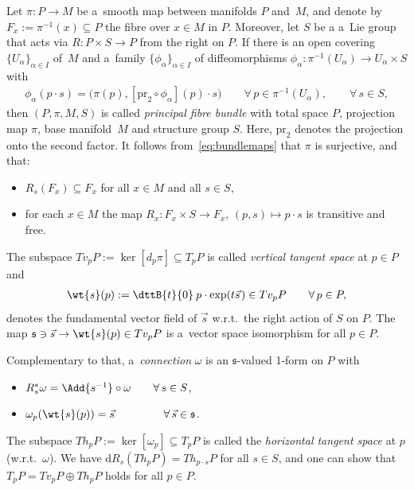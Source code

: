 \documentclass[pdftex]{sigma}
\numberwithin{equation}{section}
\begin{document}
Let $\pi\colon P\rightarrow M$ be a~smooth map between manifolds $P$ and~$M$, and denote by
$F_x:=\pi^{-1}(x)\subseteq P$ the f\/ibre over $x\in M$ in $P$.
Moreover, let $S$ be a a~Lie group that acts via $R\colon P\times S\rightarrow P$ from the right on $P$.
If there is an open covering $\{U_\alpha\}_{\alpha\in I}$ of~$M$ and a~family $\{\phi_\alpha\}_{\alpha\in I}$ of
dif\/feomorphisms $\phi_\alpha\colon \pi^{-1}(U_\alpha)\rightarrow U_\alpha\times S$ with
\begin{gather}
\label{eq:bundlemaps}
\phi_\alpha(p\cdot s)=\big(\pi(p),[\mathrm{pr}_2\circ\phi_\alpha](p)\cdot s\big)
\qquad\forall\, p\in \pi^{-1}(U_\alpha),\qquad\forall\, s\in S,
\end{gather}
then $(P,\pi,M,S)$ is called \emph{principal fibre bundle} with total space $P$,
projection map $\pi$, base manifold~$M$ and structure group $S$.
Here, $\mathrm{pr}_2$
denotes the projection onto the second factor.
It follows from~\eqref{eq:bundlemaps} that $\pi$ is surjective, and that:
\begin{itemize}\itemsep=0pt
\item
$R_s(F_x)\subseteq F_x$ for all $x\in M$ and all $s\in S$,
\item
for each $x\in M$ the map $R_x\colon F_x \times S\rightarrow F_x$, $(p,s)\mapsto p\cdot s$ is transitive and free.
\end{itemize}
The subspace $Tv_pP:=\ker[d_p\pi]\subseteq T_pP$ is called \emph{vertical tangent
space} at $p\in P$ and
\begin{gather*}
\wt{s}(p):=\dttB{t}{0}\: p\cdot \exp(t\vec{s}\hspace{1pt})\in Tv_pP
\qquad\forall\, p\in P,
\end{gather*}
denotes the fundamental vector f\/ield of $\vec{s}$ w.r.t.~the right action of $S$ on
$P$.
The map $\mathfrak{s}\ni\vec{s}\rightarrow \wt{s}(p)\in Tv_pP$ is a~vector space isomorphism for all $p\in P$.

Complementary to that, a~\emph{connection} $\omega$ is an $\mathfrak{s}$-valued 1-form on $P$ with \begin{itemize}\itemsep=0pt
\item
$R_s^{*}\omega= \Add{s^{-1}}\circ \omega\qquad \forall\,s\in S$,
\item
$\omega_p(\wt{s}(p))=\vec{s}\hspace{44pt}\forall\,\vec{s}\in \mathfrak{s}$.
\end{itemize}
The subspace $Th_pP:=\ker[\omega_p]\subseteq T_pP$ is called the \emph{horizontal
tangent space} at $p$ (w.r.t.~$\omega$).
We have $\mathrm{d} R_s(Th_pP)=Th_{p\cdot s}P$ for all $s\in S$, and one can show that $T_pP= Tv_pP\oplus Th_pP$ holds for all
$p\in P$.
\end{document}
